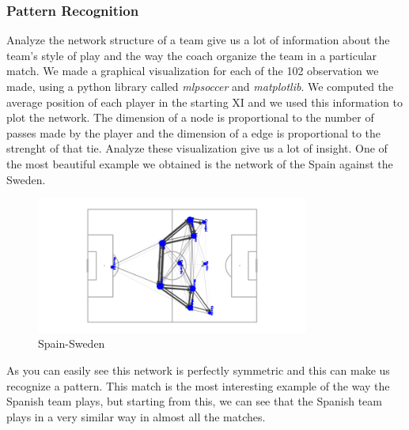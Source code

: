 \documentclass[12pt, a4paper]{article}
\begin{document}
\subsubsection{Pattern Recognition}
Analyze the network structure of a team give us a lot of information about the team's style of play and the way the coach organize the team in a particular match. We made a graphical visualization for each of the 102 observation we made, using a python library called \emph{mlpsoccer} and \emph{matplotlib}. We computed the average position of each player in the starting XI and we used this information to plot the network. The dimension of a node is proportional to the number of passes made by the player and the dimension of a edge is proportional to the strenght of that tie. Analyze these visualization give us a lot of insight. One of the most beautiful example we obtained is the network of the Spain against the Sweden. \\
\begin{figure}[H]
        \centering
        \includegraphics[width=0.8\textwidth]{../NoSubs/imgWithoutSubs/Spain_Network_Spain_Sweden.png}
        \caption{Spain-Sweden}
        \label{fig: spain_sweden}
\end{figure}
As you can easily see this network is perfectly symmetric and this can make us recognize a pattern. This match is the most interesting example of the way the Spanish team plays, but starting from this, we can see that the Spanish team plays in a very similar way in almost all the matches. \\
\begin{figure}[H]
        \centering
        \qquad
        \label{fig: spain_pattern}%
\end{figure}
\end{document}
